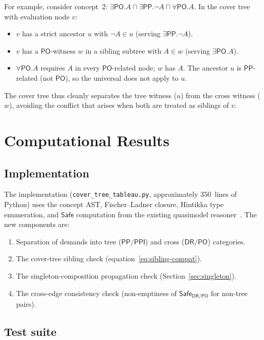 \documentclass[a4paper,11pt]{article}
\theoremstyle{definition}
\newcommand{\DR}{\ensuremath{\mathsf{DR}}}
\newcommand{\PO}{\ensuremath{\mathsf{PO}}}
\newcommand{\PP}{\ensuremath{\mathsf{PP}}}
\newcommand{\PPI}{\ensuremath{\mathsf{PPI}}}
\newcommand{\Safe}{\ensuremath{\mathsf{Safe}}}
\begin{document}
For example, consider concept~2:
$\exists\PO.A \sqcap \exists\PP.\neg A \sqcap \forall\PO.A$.
In the cover tree with evaluation node $v$:
\begin{itemize}[nosep]
  \item $v$ has a strict ancestor $u$ with $\neg A \in u$
    (serving $\exists\PP.\neg A$).
  \item $v$ has a $\PO$-witness $w$ in a sibling subtree with
    $A \in w$ (serving $\exists\PO.A$).
  \item $\forall\PO.A$ requires $A$ in every $\PO$-related node;
    $w$ has $A$. The ancestor $u$ is $\PP$-related (not $\PO$),
    so the universal does not apply to $u$.
\end{itemize}

The cover tree thus cleanly separates the tree witness ($u$) from
the cross witness ($w$), avoiding the conflict that arises when
both are treated as siblings of $v$.


\section{Computational Results}
\label{sec:results}

\subsection{Implementation}

The implementation (\texttt{cover\_tree\_tableau.py}, approximately
350~lines of Python) uses the concept AST, Fischer--Ladner closure,
Hintikka type enumeration, and $\Safe$ computation from the
existing quasimodel reasoner~\cite{ClaudeDecidability}.
The new components are:
\begin{enumerate}[nosep]
  \item Separation of demands into tree ($\PP/\PPI$) and cross
    ($\DR/\PO$) categories.
  \item The cover-tree sibling check
    (equation~\eqref{eq:sibling-compat}).
  \item The singleton-composition propagation check
    (Section~\ref{sec:singleton}).
  \item The cross-edge consistency check
    (non-emptiness of $\Safe_{\DR/\PO}$ for non-tree pairs).
\end{enumerate}

\subsection{Test suite}
\end{document}
